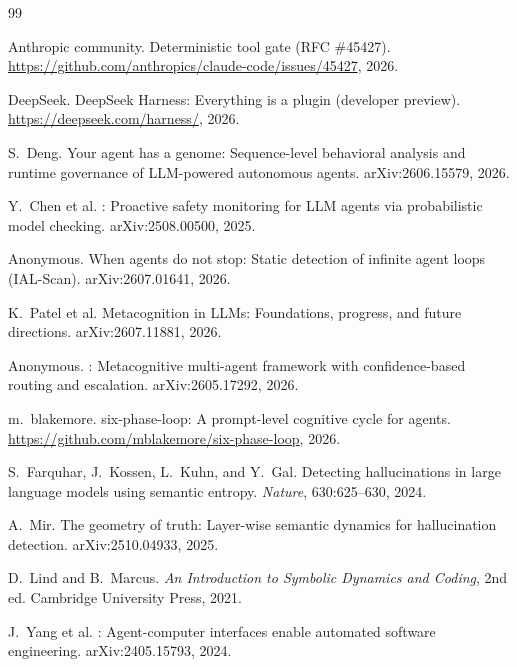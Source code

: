 \documentclass{article}
\begin{document}

\begin{thebibliography}{99}

Anthropic community.
\newblock Deterministic tool gate (RFC \#45427).
\newblock \url{https://github.com/anthropics/claude-code/issues/45427}, 2026.

DeepSeek.
\newblock DeepSeek Harness: Everything is a plugin (developer preview).
\newblock \url{https://deepseek.com/harness/}, 2026.

S.~Deng.
\newblock Your agent has a genome: Sequence-level behavioral analysis and runtime governance of {LLM}-powered autonomous agents.
\newblock arXiv:2606.15579, 2026.

Y.~Chen et al.
: Proactive safety monitoring for {LLM} agents via probabilistic model checking.
\newblock arXiv:2508.00500, 2025.

Anonymous.
\newblock When agents do not stop: Static detection of infinite agent loops ({IAL-Scan}).
\newblock arXiv:2607.01641, 2026.

K.~Patel et al.
\newblock Metacognition in {LLMs}: Foundations, progress, and future directions.
\newblock arXiv:2607.11881, 2026.

Anonymous.
: Metacognitive multi-agent framework with confidence-based routing and escalation.
\newblock arXiv:2605.17292, 2026.

m.~blakemore.
\newblock six-phase-loop: A prompt-level cognitive cycle for agents.
\newblock \url{https://github.com/mblakemore/six-phase-loop}, 2026.

S.~Farquhar, J.~Kossen, L.~Kuhn, and Y.~Gal.
\newblock Detecting hallucinations in large language models using semantic entropy.
\newblock \emph{Nature}, 630:625--630, 2024.

A.~Mir.
\newblock The geometry of truth: Layer-wise semantic dynamics for hallucination detection.
\newblock arXiv:2510.04933, 2025.

D.~Lind and B.~Marcus.
\newblock \emph{An Introduction to Symbolic Dynamics and Coding}, 2nd ed.
\newblock Cambridge University Press, 2021.

J.~Yang et al.
: Agent-computer interfaces enable automated software engineering.
\newblock arXiv:2405.15793, 2024.

\end{thebibliography}
\end{document}
